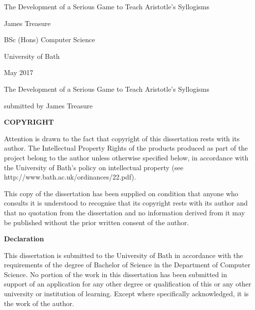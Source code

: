 \documentclass[12pt,a4paper]{report}
\begin{document}
\begin{titlepage}\centering
\vspace*{\fill}
\LARGE The Development of a Serious Game to Teach Aristotle's Syllogisms\par
\vspace{0.5cm}
\normalsize James Treasure\par
\vspace{0.5cm}
\normalsize	BSc (Hons) Computer Science\par
\normalsize	University of Bath\par
\normalsize	May 2017
\vspace*{\fill}

\end{titlepage}

\newpage
\clearpage
\thispagestyle{plain}
\vspace*{\fill}


The Development of a Serious Game to Teach Aristotle's Syllogisms

submitted by James Treasure
\vspace{0.5cm}

{\large{\textbf{COPYRIGHT}}}

Attention is drawn to the fact that copyright of this dissertation rests with its author. The Intellectual Property Rights of the products produced as part of the
project belong to the author unless otherwise specified below, in accordance with
the University of Bath's policy on intellectual property
(see http://www.bath.ac.uk/ordinances/22.pdf).

This copy of the dissertation has been supplied on condition that anyone who
consults it is understood to recognise that its copyright rests with its author and
that no quotation from the dissertation and no information derived from it may
be published without the prior written consent of the author.
\vspace{0.5cm}

{\large{\textbf{Declaration}}}

This dissertation is submitted to the University of Bath in accordance with the
requirements of the degree of Bachelor of Science in the Department of Computer
Science. No portion of the work in this dissertation has been submitted in support
of an application for any other degree or qualification of this or any other
university or institution of learning. Except where specifically acknowledged, it is
the work of the author.

\vspace{0.5cm}
\end{document}

